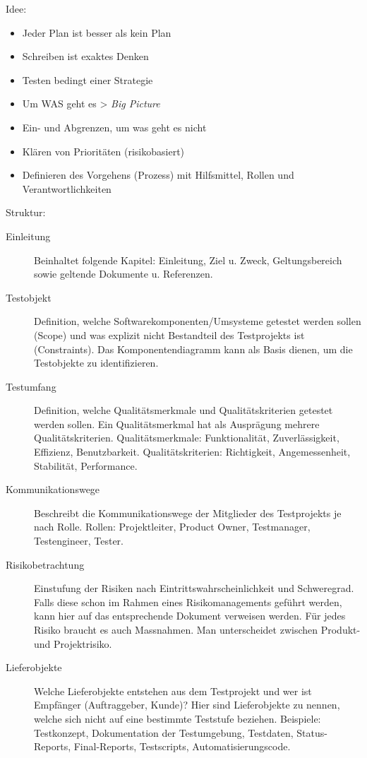 Idee:
\begin{itemize}
	\item Jeder Plan ist besser als kein Plan
	\item Schreiben ist exaktes Denken
	\item Testen bedingt einer Strategie
	\item Um WAS geht es > \emph{Big Picture}
	\item Ein- und Abgrenzen, um was geht es nicht
	\item Klären von Prioritäten (risikobasiert)
	\item Definieren des Vorgehens (Prozess) mit Hilfsmittel, Rollen und Verantwortlichkeiten
\end{itemize}

Struktur:
\begin{description}
	\item[Einleitung] Beinhaltet folgende Kapitel: Einleitung, Ziel u. Zweck, Geltungsbereich sowie geltende Dokumente u. Referenzen.
	
	\item[Testobjekt] Definition, welche Softwarekomponenten/Umsysteme getestet werden sollen (Scope) und was explizit nicht Bestandteil des Testprojekts ist (Constraints). Das Komponentendiagramm kann als Basis dienen, um die Testobjekte zu identifizieren.
	
	\item[Testumfang] Definition, welche Qualitätsmerkmale und Qualitätskriterien getestet werden sollen. Ein Qualitätsmerkmal hat als Ausprägung mehrere Qualitätskriterien. Qualitätsmerkmale: Funktionalität, Zuverlässigkeit, Effizienz, Benutzbarkeit. Qualitätskriterien: Richtigkeit, Angemessenheit, Stabilität, Performance.
	
	\item[Kommunikationswege] Beschreibt die Kommunikationswege der Mitglieder des Testprojekts je nach Rolle. Rollen: Projektleiter, Product Owner, Testmanager, Testengineer, Tester.
	
	\item[Risikobetrachtung] Einstufung der Risiken nach Eintrittswahrscheinlichkeit und Schweregrad. Falls diese schon im Rahmen eines Risikomanagements geführt werden, kann hier auf das entsprechende Dokument verweisen werden. Für jedes Risiko braucht es auch Massnahmen. Man unterscheidet zwischen Produkt- und Projektrisiko.
	
	\item[Lieferobjekte] Welche Lieferobjekte entstehen aus dem Testprojekt und wer ist Empfänger (Auftraggeber, Kunde)?  Hier sind Lieferobjekte zu nennen, welche sich nicht auf eine bestimmte Teststufe beziehen. Beispiele: Testkonzept, Dokumentation der Testumgebung, Testdaten, Status-Reports, Final-Reports, Testscripts, Automatisierungscode.
	

\end{description}
